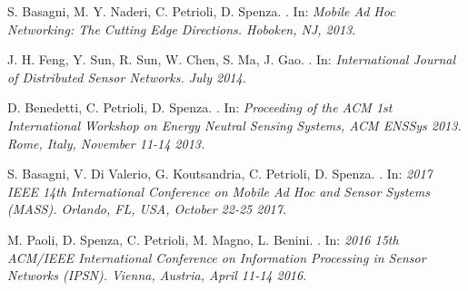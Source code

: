 \documentclass[binding=0.6cm,TFA]{sapthesis}
\begin{document}
\begin{thebibliography}{9}
    S. Basagni, M. Y. Naderi, C. Petrioli, D. Spenza.
    .
    In: \textit{Mobile Ad Hoc Networking: The Cutting Edge Directions. Hoboken, NJ, 2013}.

    \newpage        %

    J. H. Feng, Y. Sun, R. Sun, W. Chen, S. Ma, J. Gao.
    .
    In: \textit{International Journal of Distributed Sensor Networks. July 2014.}

    D. Benedetti, C. Petrioli, D. Spenza.
    .
    In: \textit{Proceeding of the ACM 1st International Workshop on Energy Neutral Sensing Systems, ACM ENSSys 2013. Rome, Italy, November 11-14 2013.}

    S. Basagni, V. Di Valerio, G. Koutsandria, C. Petrioli, D. Spenza.
    .
    In: \textit{2017 IEEE 14th International Conference on Mobile Ad Hoc and Sensor Systems (MASS). Orlando, FL, USA, October 22-25 2017.}

    M. Paoli, D. Spenza, C. Petrioli, M. Magno, L. Benini.
    .
    In: \textit{2016 15th ACM/IEEE International Conference on Information Processing in Sensor Networks (IPSN). Vienna, Austria, April 11-14 2016.}

\end{thebibliography}
\end{document}
